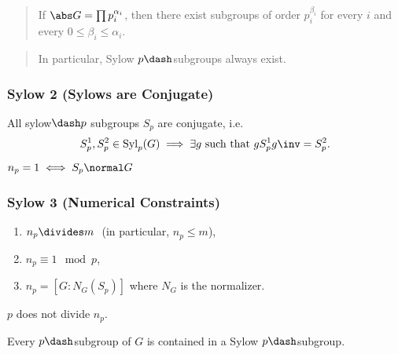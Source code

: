 \begin{quote}
If \(\abs G = \prod p_i^{\alpha_i}\), then there exist subgroups of
order \(p_i^{\beta_i}\) for every \(i\) and every
\(0 \leq \beta_i \leq \alpha_i\).
\end{quote}

\begin{quote}
In particular, Sylow \(p\dash\)subgroups always exist.
\end{quote}

\hypertarget{sylow-2-sylows-are-conjugate}{%
\subsubsection{Sylow 2 (Sylows are
Conjugate)}\label{sylow-2-sylows-are-conjugate}}

All sylow\(\dash p\) subgroups \(S_p\) are conjugate, i.e.
\begin{align*}
S_p^1, S_p^2 \in \mathrm{Syl}_p(G) \implies \exists g \text{ such that } g S_p^1g\inv = S_p^2
.\end{align*}

\begin{corollary}

\(n_p = 1 \iff S_p \normal G\)

\end{corollary}

\hypertarget{sylow-3-numerical-constraints}{%
\subsubsection{Sylow 3 (Numerical
Constraints)}\label{sylow-3-numerical-constraints}}

\begin{enumerate}
\def\labelenumi{\arabic{enumi}.}
\item
  \(n_p \divides m~\) (in particular, \(n_p \leq m\)),
\item
  \(n_p \equiv 1 \mod p\),
\item
  \(n_p = [G : N_G(S_p)]\) where \(N_G\) is the normalizer.
\end{enumerate}

\begin{corollary}

\(p\) does not divide \(n_p\).

\end{corollary}

\begin{proposition}

Every \(p\dash\)subgroup of \(G\) is contained in a Sylow
\(p\dash\)subgroup.

\end{proposition}

